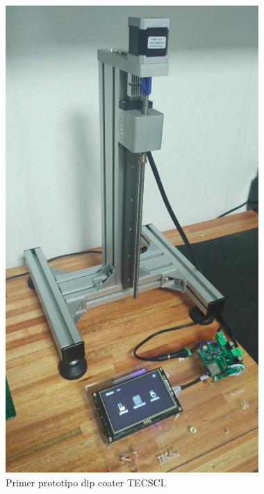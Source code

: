 \begin{figure}[ht]
	\centering
	\includegraphics[width=.5\textwidth]{./Figures/real.png}
	\caption{Primer prototipo dip coater TECSCI.}
	\label{fig:mecanica_real_model}
\end{figure}